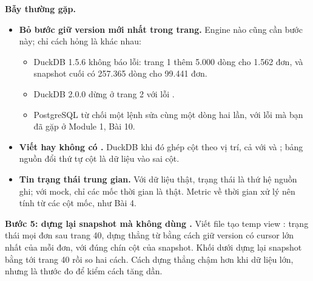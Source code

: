 \begin{luuy}
\textbf{Bẫy thường gặp.}
\begin{itemize}
  \item \textbf{Bỏ bước giữ version mới nhất trong trang.} Engine nào cũng cần bước này; chỉ cách hỏng là khác nhau:
  \begin{itemize}
    \item DuckDB 1.5.6 không báo lỗi: trang 1 thêm 5.000 dòng cho 1.562 đơn, và snapshot cuối có 257.365 dòng cho 99.441 đơn.
    \item DuckDB 2.0.0 dừng ở trang 2 với lỗi .
    \item PostgreSQL từ chối một lệnh sửa cùng một dòng hai lần, với lỗi  mà bạn đã gặp ở Module 1, Bài 10.
  \end{itemize}
  \item \textbf{Viết  hay  không có .} DuckDB khi đó ghép cột theo vị trí, cả với  và ; bảng nguồn đổi thứ tự cột là dữ liệu vào sai cột.
  \item \textbf{Tin trạng thái trung gian.} Với dữ liệu thật, trạng thái là thứ hệ nguồn ghi; với mock, chỉ các mốc thời gian là thật. Metric về thời gian xử lý nên tính từ các cột mốc, như Bài 4.
\end{itemize}
\end{luuy}

\textbf{Bước 5: dựng lại snapshot mà không dùng .} Viết file  tạo temp view : trạng thái mọi đơn sau trang 40, dựng thẳng từ  bằng cách giữ version có cursor lớn nhất của mỗi đơn, với đúng chín cột của snapshot. Khối dưới dựng lại snapshot bằng  tới trang 40 rồi so hai cách. Cách dựng thẳng chậm hơn khi dữ liệu lớn, nhưng là thước đo để kiểm cách tăng dần.

